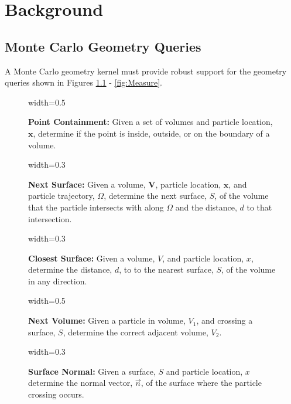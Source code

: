 \newcommand{\geomQuery}[4] {
  \begin{figure}[H]
    \centering
    {width=#3\textwidth}
    \caption[Explanation of the \textit{#1} geometry query]{\textbf{#1:}#4}
    \label{fig:#1}
  \end{figure}
}

\newcommand{\vecdatatype}[2]{
  \null
  \textbf{#1}
  \begin{adjustwidth}{1em}{0pt}
    #2
  \end{adjustwidth}
  \null
}

\renewcommand{\thefootnote}{\fnsymbol{footnote}}


\chapter{Background}\label{ch:background}

\section{Monte Carlo Geometry Queries}\label{sec:mc-geom-queries}

A Monte Carlo geometry kernel must provide robust support for the geometry
queries shown in Figures \ref{fig:Point Containment} - \ref{fig:Measure}.

\geomQuery{Point Containment}{plc_query}{0.5}{
Given a set of volumes and particle location, $\mathbf{x}$, determine if the
point is inside, outside, or on the boundary of a volume.
}

\geomQuery{Next Surface}{dtb_query}{0.3}{
Given a volume, $\mathbf{V}$, particle location, $\mathbf{x}$, and particle
trajectory, \boldmath$\Omega$, determine the next surface, \boldmath$S$, of the
volume that the particle intersects with along \boldmath$\Omega$ and the
distance, \boldmath$d$ to that intersection.
}

\geomQuery{Closest Surface}{ctl_query}{0.3}{
Given a volume, \boldmath$V$, and particle location, \boldmath$x$, determine
the distance, \boldmath$d$, to to the nearest surface, \boldmath$S$, of the
volume in any direction.
}

\geomQuery{Next Volume}{next_vol_query}{0.5}{
Given a particle in volume, \boldmath$V_1$, and crossing a surface, \boldmath$S$,
determine the correct adjacent volume, \boldmath$V_2$.
}

\geomQuery{Surface Normal}{normal_query}{0.3}{
Given a surface, \boldmath$S$ and particle location, \boldmath$x$ determine
the normal vector, \boldmath$\vec{n}$, of the surface where the particle
crossing occurs.}

